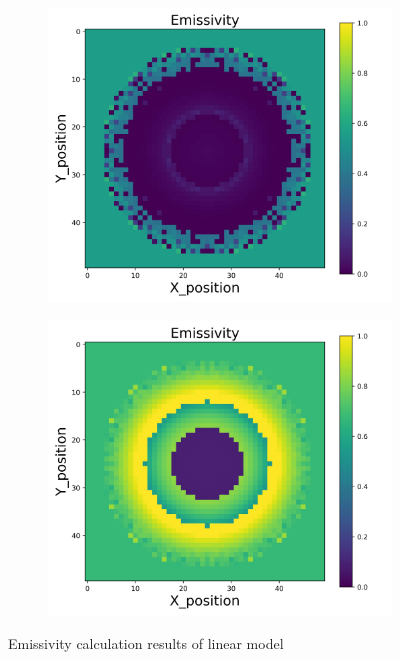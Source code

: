 {\begin{figure}[p]
\begin{minipage}{\textwidth}
\begin{subfigure}{0.325\textwidth}
        \end{subfigure}
    \end{minipage}\\
    \begin{minipage}{\textwidth}
        \centering
        \begin{subfigure}{0.325\textwidth}
            \centering
            \includegraphics[width=\textwidth]{figures/raw_data/32/linear/emi_cal.jpg}
        \end{subfigure}
        \begin{subfigure}{0.325\textwidth}
            \centering
            \includegraphics[width=\textwidth]{figures/raw_data/33/linear/emi_cal.jpg}
        \end{subfigure}
    \end{minipage}
    \caption{Emissivity calculation results of linear model}  
\end{figure}


}
